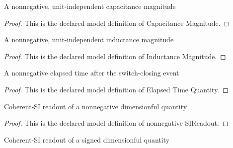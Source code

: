 \begin{definition}
  \label{def:physics:phyx-mini-0991:phyxminiproblems-problemphyxmini0991-capacitancemagnitude}
  A nonnegative, unit-independent capacitance magnitude
\end{definition}
\begin{proof}
  This is the declared model definition of Capacitance Magnitude.
\end{proof}
\begin{definition}
  \label{def:physics:phyx-mini-0991:phyxminiproblems-problemphyxmini0991-inductancemagnitude}
  A nonnegative, unit-independent inductance magnitude
\end{definition}
\begin{proof}
  This is the declared model definition of Inductance Magnitude.
\end{proof}
\begin{definition}
  \label{def:physics:phyx-mini-0991:phyxminiproblems-problemphyxmini0991-elapsedtimequantity}
  A nonnegative elapsed time after the switch-closing event
\end{definition}
\begin{proof}
  This is the declared model definition of Elapsed Time Quantity.
\end{proof}
\begin{definition}
  \label{def:physics:phyx-mini-0991:phyxminiproblems-problemphyxmini0991-nonnegativesireadout}
  Coherent-SI readout of a nonnegative dimensionful quantity
\end{definition}
\begin{proof}
  This is the declared model definition of nonnegative SIReadout.
\end{proof}
\begin{definition}
  \label{def:physics:phyx-mini-0991:phyxminiproblems-problemphyxmini0991-signedsireadout}
  Coherent-SI readout of a signed dimensionful quantity
\end{definition}
